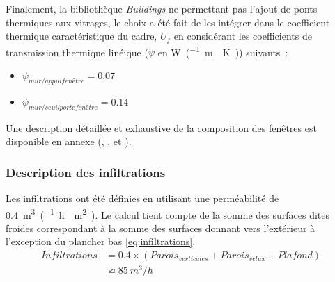 Finalement, la bibliothèque \textit{Buildings} ne permettant pas l’ajout de ponts
thermiques aux vitrages, le choix a été fait de les intégrer dans le coefficient thermique
caractéristique du cadre, $U_{f}$ en considérant les coefficients de transmission
thermique linéique ($\psi$ en \si{\watt\per(\metre\period\kelvin)}) suivants~:
\begin{itemize}
    \item $\psi_{mur / appui fenêtre} = \num{0.07}$
    \item $\psi_{mur / seuil porte fenêtre} = \num{0.14}$
\end{itemize}
Une description détaillée et exhaustive de la
composition des fenêtres est disponible en annexe (,
, et ).


\subsubsection{Description des infiltrations} %
\label{ssub:description_des_infiltrations}
Les infiltrations ont été définies en utilisant une perméabilité de
\SI{0.4}{m^{3}\per(\hour\period\meter\squared)}. Le calcul tient compte de la
somme des surfaces dites froides correspondant à la somme des surfaces donnant
vers l’extérieur à l’exception du plancher bas \eqref{eq:infiltrations}.
\begin{equation}
    \begin{aligned}
    Infiltrations &= \num{0.4} \times (Parois_{verticales} + Parois_{velux} + Plafond)\\
    &              \backsimeq \SI{85}{m^{3}/h}
    \label{eq:infiltrations}
    \end{aligned}
\end{equation}



